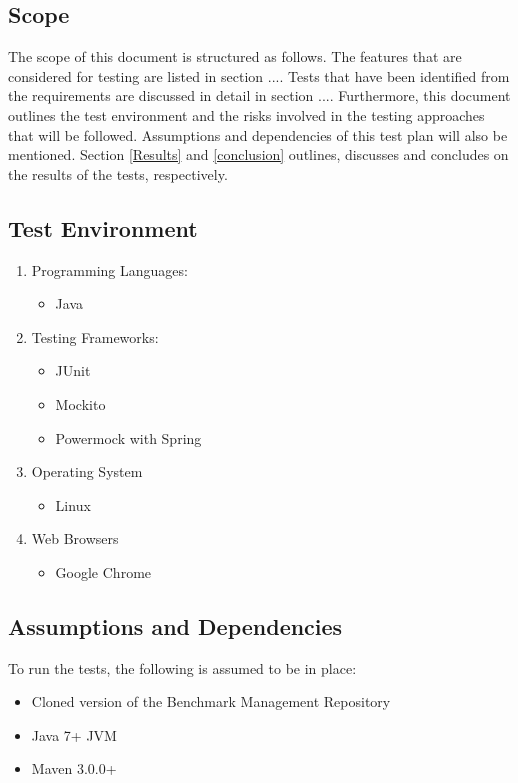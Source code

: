 \documentclass[11pt,a4paper]{article}
\begin{document}
\subsection{Scope}
The scope of this document is structured as follows. The features that are considered for
testing are listed in section .... Tests that have been identified from the requirements are
discussed in detail in section .... Furthermore, this document outlines the test environment
and the risks involved in the testing approaches that will be followed. Assumptions and
dependencies of this test plan will also be mentioned. Section \ref{Results} and \ref{conclusion} outlines,
discusses and concludes on the results of the tests, respectively.

\subsection{Test Environment}
\label{sec:testEnvironment}
\begin{enumerate}
	\item Programming Languages:
		\begin{itemize}
			\item Java
		\end{itemize}
	\item Testing Frameworks:
		\begin{itemize}
			\item JUnit
			\item Mockito
			\item Powermock with Spring
		\end{itemize}
	\item Operating System
		\begin{itemize}
			\item Linux
		\end{itemize}
	\item Web Browsers
		\begin{itemize}
			\item Google Chrome
		\end{itemize}
\end{enumerate}

\subsection{Assumptions and Dependencies}
To run the tests, the following is assumed to be in place:
\begin{itemize}
  \item Cloned version of the Benchmark Management Repository
  \item Java 7+ JVM
  \item Maven 3.0.0+
\end{itemize}
\end{document}
